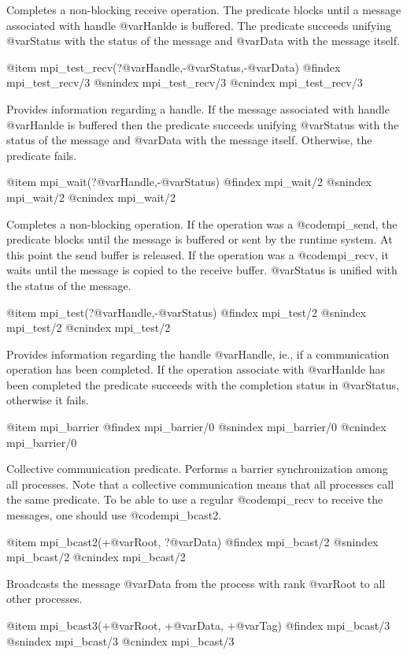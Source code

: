Completes a non-blocking receive operation. The predicate blocks until
a message associated with handle @var{Hanlde} is buffered. The
predicate succeeds unifying @var{Status} with the status of the
message and @var{Data} with the message itself. 

@item mpi_test_recv(?@var{Handle},-@var{Status},-@var{Data})
@findex mpi_test_recv/3
@snindex mpi_test_recv/3
@cnindex mpi_test_recv/3

Provides information regarding a handle. If the message associated
with handle @var{Hanlde} is buffered then the predicate succeeds
unifying @var{Status} with the status of the message and @var{Data}
with the message itself. Otherwise, the predicate fails.


@item mpi_wait(?@var{Handle},-@var{Status})
@findex mpi_wait/2
@snindex mpi_wait/2
@cnindex mpi_wait/2

Completes a non-blocking operation. If the operation was a
@code{mpi_send}, the predicate blocks until the message is buffered
or sent by the runtime system. At this point the send buffer is
released. If the operation was a @code{mpi_recv}, it waits until the
message is copied to the receive buffer. @var{Status} is unified with
the status of the message.

@item mpi_test(?@var{Handle},-@var{Status})
@findex mpi_test/2
@snindex mpi_test/2
@cnindex mpi_test/2

Provides information regarding the handle @var{Handle}, ie., if a
communication operation has been completed.  If the operation
associate with @var{Hanlde} has been completed the predicate succeeds
with the completion status in @var{Status}, otherwise it fails.

@item mpi_barrier
@findex mpi_barrier/0
@snindex mpi_barrier/0
@cnindex mpi_barrier/0

Collective communication predicate.  Performs a barrier
synchronization among all processes. Note that a collective
communication means that all processes call the same predicate. To be
able to use a regular @code{mpi_recv} to receive the messages, one
should use @code{mpi_bcast2}.


@item mpi_bcast2(+@var{Root}, ?@var{Data})
@findex mpi_bcast/2
@snindex mpi_bcast/2
@cnindex mpi_bcast/2

Broadcasts the message @var{Data} from the process with rank @var{Root}
to all other processes.

@item mpi_bcast3(+@var{Root}, +@var{Data}, +@var{Tag})
@findex mpi_bcast/3
@snindex mpi_bcast/3
@cnindex mpi_bcast/3

